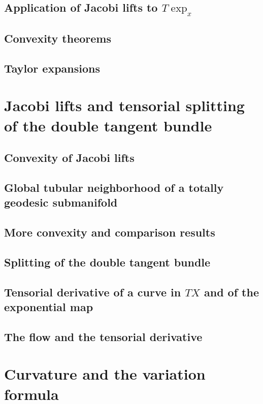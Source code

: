 \documentclass[a4paper]{article}
\begin{document}
\subsection{Application of Jacobi lifts to $T\exp_x$}

\subsection{Convexity theorems}

\subsection{Taylor expansions}

\section{Jacobi lifts and tensorial splitting of the double tangent bundle}

\subsection{Convexity of Jacobi lifts}

\subsection{Global tubular neighborhood of a totally geodesic submanifold}

\subsection{More convexity and comparison results}

\subsection{Splitting of the double tangent bundle}

\subsection{Tensorial derivative of a curve in $TX$ and of the exponential map}

\subsection{The flow and the tensorial derivative}

\section{Curvature and the variation formula}
\end{document}
